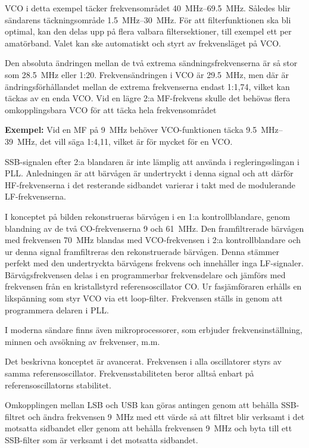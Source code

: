 VCO i detta exempel täcker frekvensområdet \SIrange{40}{69,5}{\mega\hertz}.
Således blir sändarens täckningsområde \SIrange{1,5}{30}{\mega\hertz}.
För att filterfunktionen ska bli optimal, kan den delas upp på flera
valbara filtersektioner, till exempel ett per amatörband.
Valet kan ske automatiskt och styrt av frekvensläget på VCO.

Den absoluta ändringen mellan de två extrema sändningsfrekvenserna är
så stor som \qty{28,5}{\mega\hertz} eller 1:20.
Frekvensändringen i VCO är \qty{29,5}{\mega\hertz}, men där är
ändringsförhållandet mellan de extrema frekvenserna endast 1:1,74, vilket kan
täckas av en enda VCO.
Vid en lägre 2:a MF-frekvens skulle det behövas flera omkopplingsbara
VCO för att täcka hela frekvensområdet

\textbf{Exempel:} Vid en MF på \qty{9}{\mega\hertz} behöver VCO-funktionen täcka
\SIrange{9,5}{39}{\mega\hertz}, det vill säga 1:4,11, vilket är för mycket för
en VCO.

SSB-signalen efter 2:a blandaren är inte lämplig att använda i
regleringsslingan i PLL.
Anledningen är att bärvågen är undertryckt i denna signal och att därför
HF-frekvenserna i det resterande sidbandet varierar i takt med de
modulerande LF-frekvenserna.

I konceptet på bilden rekonstrueras bärvågen i en 1:a kontrollblandare,
genom blandning av de två CO-frekvenserna 9 och \qty{61}{\mega\hertz}.
Den framfiltrerade bärvågen med frekvensen \qty{70}{\mega\hertz} blandas med
VCO-frekvensen i 2:a kontrollblandare och ur denna signal
framfiltreras den rekonstruerade bärvågen.
Denna stämmer perfekt med den undertryckta bärvågens frekvens och
innehåller inga LF-signaler.
Bärvågsfrekvensen delas i en programmerbar frekvensdelare och jämförs
med frekvensen från en kristallstyrd referensoscillator CO.
Ur fasjämföraren erhålls en likspänning som styr VCO via ett loop-filter.
Frekvensen ställs in genom att programmera delaren i PLL.

I moderna sändare finns även mikroprocessorer, som erbjuder
frekvensinställning, minnen och avsökning av frekvenser, m.m.

Det beskrivna konceptet är avancerat.
Frekvensen i alla oscillatorer styrs av samma referensoscillator.
Frekvensstabiliteten beror alltså enbart på referensoscillatorns stabilitet.

Omkopplingen mellan LSB och USB kan göras antingen genom att behålla SSB-filtret
och ändra frekvensen \qty{9}{\mega\hertz} med ett värde så att filtret blir
verksamt i det motsatta sidbandet eller genom att behålla frekvensen
\qty{9}{\mega\hertz} och byta till ett SSB-filter som är verksamt i det motsatta
sidbandet.

